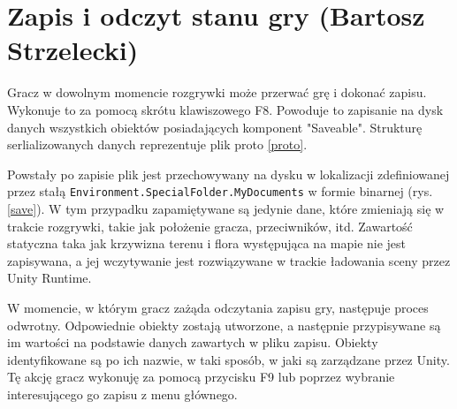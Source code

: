 \section{Zapis i odczyt stanu gry (Bartosz Strzelecki)}\label{s:save_impl}

Gracz w dowolnym momencie rozgrywki może przerwać grę i dokonać zapisu. Wykonuje to
za pomocą skrótu klawiszowego F8. Powoduje to zapisanie na dysk danych wszystkich obiektów posiadających
komponent "Saveable". Strukturę serlializowanych danych reprezentuje plik proto \ref{proto}.


Powstały po zapisie plik jest przechowywany na dysku w lokalizacji zdefiniowanej przez stałą \verb|Environment.SpecialFolder.MyDocuments| w formie binarnej (rys. \ref{save}).
W tym przypadku zapamiętywane są jedynie dane, które zmieniają się w trakcie rozgrywki, takie jak położenie gracza, przeciwników, itd. 
Zawartość statyczna taka jak krzywizna terenu i flora występująca na mapie nie jest zapisywana, a jej wczytywanie jest rozwiązywane
w trackie ładowania sceny przez Unity Runtime.

W momencie, w którym gracz zażąda odczytania zapisu gry, następuje proces odwrotny. Odpowiednie obiekty zostają utworzone,
a następnie przypisywane są im wartości na podstawie danych zawartych w pliku zapisu. Obiekty identyfikowane
są po ich nazwie, w taki sposób, w jaki są zarządzane przez Unity.
Tę akcję gracz wykonuję za pomocą przycisku F9 lub poprzez wybranie interesującego go zapisu z menu głównego.

